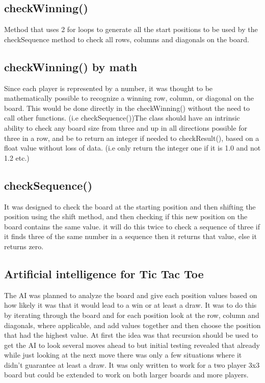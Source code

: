 \documentclass[a4paper,10pt]{article}
\begin{document}
	\subsection{checkWinning()}
	Method that uses 2 for loops to generate all the start positions to be used by the checkSequence method to check all rows, columns and diagonals on the board. 
	\subsection{checkWinning() by math}
	Since each player is represented by a number, it was thought to be mathematically possible to recognize a winning row, column, or diagonal on the board.  This would be done directly in the checkWinning() without the need to call other functions. (i.e checkSequence())The class should have an intrinsic ability to check any board size from three and up in all directions possible for three in a row, and be to return an integer if needed to checkResult(), based on a float value without loss of data.  (i.e only return the integer one if it is 1.0 and not 1.2 etc.)
	
	\subsection{checkSequence()}
	It was designed to check the board at the starting position and then shifting the position using the shift method, and then checking if this new position on the board contains the same value. it will do this twice to check a sequence of three if it finds three of the same number in a sequence then it returns that value, else it returns zero.
	\subsection{Artificial intelligence for Tic Tac Toe}
	The AI was planned to analyze the board and give each position values based on how likely it was that it would lead to a win or at least a draw. It was to do this by iterating through the board and for each position look at the row, column and diagonals, where applicable, and add values together and then choose the position that had the highest value. At first the idea was  that recursion should be used to get the AI to look several moves ahead to but initial testing revealed that already while just looking at the next move there was only a few situations where it didn’t guarantee at least a draw.
	It was only written to work for a two player 3x3 board but could be extended to work on both larger boards and more players.
	
\end{document}
